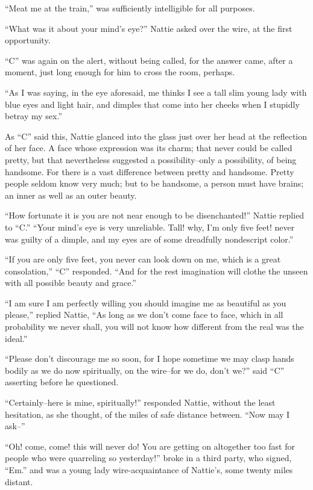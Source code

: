 ``Meat me at the train,'' was sufficiently intelligible for all purposes.

``What was it about your mind's eye?'' Nattie asked over the wire, at the
first opportunity.

``C'' was again on the alert, without being called, for the answer came,
after a moment, just long enough for him to cross the room, perhaps.

``As I was saying, in the eye aforesaid, me thinks I see a tall slim
young lady with blue eyes and light hair, and dimples that come into her
cheeks when I stupidly betray my sex.''

As ``C'' said this, Nattie glanced into the glass just over her head at
the reflection of her face. A face whose expression was its charm; that
never could be called pretty, but that nevertheless suggested a
possibility--only a possibility, of being handsome. For there is a vast
difference between pretty and handsome. Pretty people seldom know very
much; but to be handsome, a person must have brains; an inner as well as
an outer beauty.

``How fortunate it is you are not near enough to be disenchanted!'' Nattie
replied to ``C.'' ``Your mind's eye is very unreliable. Tall! why, I'm
only five feet! never was guilty of a dimple, and my eyes are of some
dreadfully nondescript color.''

``If you are only five feet, you never can look down on me, which is a
great consolation,'' ``C'' responded. ``And for the rest imagination will
clothe the unseen with all possible beauty and grace.''

``I am sure I am perfectly willing you should imagine me as beautiful as
you please,'' replied Nattie, ``As long as we don't come face to face,
which in all probability we never shall, you will not know how different
from the real was the ideal.''

``Please don't discourage me so soon, for I hope sometime we may clasp
hands bodily as we do now spiritually, on the wire--for we do, don't
we?'' said ``C'' asserting before he questioned.

``Certainly--here is mine, spiritually!'' responded Nattie, without the
least hesitation, as she thought, of the miles of safe distance between.
``Now may I ask--''

``Oh! come, come! this will never do! You are getting on altogether too
fast for people who were quarreling so yesterday!'' broke in a third
party, who signed, ``Em.'' and was a young lady wire-acquaintance of
Nattie's, some twenty miles distant.

